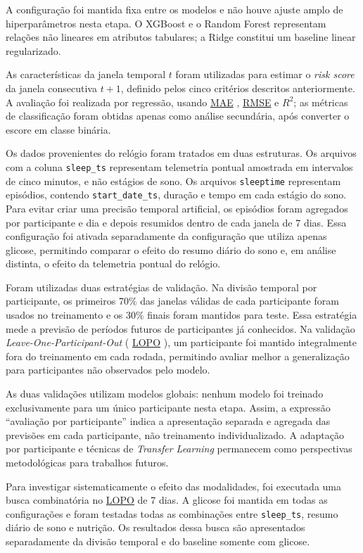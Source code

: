 \documentclass[12pt,a4paper]{article}
\DeclareRobustCommand{\sigla}[1]{%
    \texorpdfstring{\hyperlink{sigla:#1}{#1}}{#1}%
}
\begin{document}
A configuração foi mantida fixa entre os modelos e não houve ajuste amplo de
hiperparâmetros nesta etapa. O XGBoost e o Random Forest representam relações
não lineares em atributos tabulares; a Ridge constitui um baseline linear
regularizado.

As características da janela temporal $t$ foram utilizadas para estimar o
\textit{risk score} da janela consecutiva $t+1$, definido pelos cinco critérios
descritos anteriormente. A avaliação foi realizada por regressão, usando
\sigla{MAE}, \sigla{RMSE} e
$R^2$; as métricas de classificação foram obtidas apenas como análise
secundária, após converter o escore em classe binária.

Os dados provenientes do relógio foram tratados em duas estruturas. Os
arquivos com a coluna \texttt{sleep\_ts} representam telemetria pontual
amostrada em intervalos de cinco minutos, e não estágios de sono. Os arquivos
\texttt{sleeptime} representam episódios, contendo
\texttt{start\_date\_ts}, duração e tempo em cada estágio do sono. Para evitar
criar uma precisão temporal artificial, os episódios foram agregados por
participante e dia e depois resumidos dentro de cada janela de 7 dias. Essa
configuração foi ativada separadamente da configuração que utiliza apenas
glicose, permitindo comparar o efeito do resumo diário do sono e, em análise
distinta, o efeito da telemetria pontual do relógio.

Foram utilizadas duas estratégias de validação. Na divisão temporal por
participante, os primeiros 70\% das janelas válidas de cada participante foram
usados no treinamento e os 30\% finais foram mantidos para teste. Essa
estratégia mede a previsão de períodos futuros de participantes já conhecidos.
Na validação \textit{Leave-One-Participant-Out} (\sigla{LOPO}), um participante foi
mantido integralmente fora do treinamento em cada rodada, permitindo avaliar
melhor a generalização para participantes não observados pelo modelo.

As duas validações utilizam modelos globais: nenhum modelo foi treinado
exclusivamente para um único participante nesta etapa. Assim, a expressão
“avaliação por participante” indica a apresentação separada e agregada das
previsões em cada participante, não treinamento individualizado. A adaptação
por participante e técnicas de \textit{Transfer Learning} permanecem como
perspectivas metodológicas para trabalhos futuros.

Para investigar sistematicamente o efeito das modalidades, foi executada uma
busca combinatória no \sigla{LOPO} de 7 dias. A glicose foi mantida em todas as
configurações e foram testadas todas as combinações entre
\texttt{sleep\_ts}, resumo diário de sono e nutrição. Os resultados dessa
busca são apresentados separadamente da divisão temporal e do baseline
somente com glicose.
\end{document}
